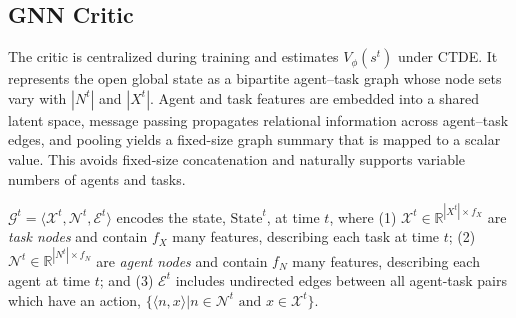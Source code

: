 \subsection{GNN Critic} \label{critic}
The critic is centralized during training and estimates $V_\phi(s^t)$ under CTDE. It represents the open global state as a bipartite agent--task graph whose node sets vary with $|N^t|$ and $|X^t|$. Agent and task features are embedded into a shared latent space, message passing propagates relational information across agent--task edges, and pooling yields a fixed-size graph summary that is mapped to a scalar value. This avoids fixed-size concatenation and naturally supports variable numbers of agents and tasks.



$\mathcal{G}^t = \langle\mathcal{X}^t, \mathcal{N}^t, \mathcal{E}^t\rangle$
encodes the state, $\text{State}^t$, at time $t$, where
(1) $\mathcal{X}^t \in \mathbb{R}^{|X^t|\times f_X}$ are \emph{task nodes} and contain $f_X$ many features, describing each task at time $t$; (2) $\mathcal{N}^t \in \mathbb{R}^{|N^t|\times f_N}$ are \emph{agent nodes} and contain $f_N$ many features, describing each agent at time $t$; and (3) 
$\mathcal{E}^t$ includes undirected edges between all agent-task pairs which have an action, $\{\langle n,x\rangle | n\in \mathcal{N}^t \text{ and }x\in \mathcal{X}^t\}$.  

